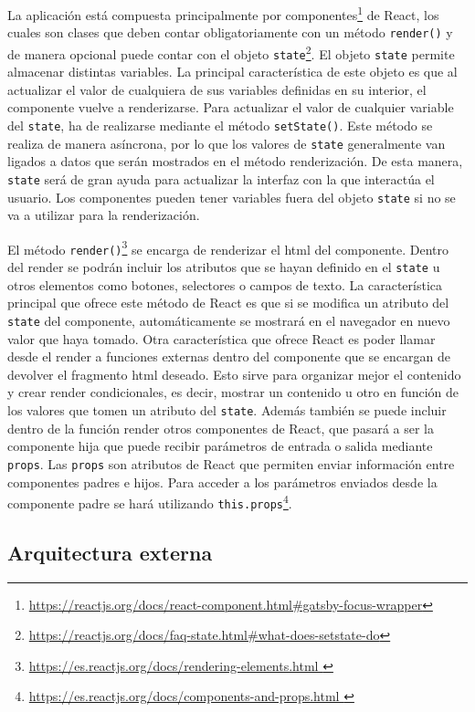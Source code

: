 La aplicación está compuesta principalmente por componentes\footnote{\url{https://reactjs.org/docs/react-component.html\#gatsby-focus-wrapper}} de React, los cuales son clases que deben contar obligatoriamente con un método \texttt{render()} y de manera opcional puede contar con el objeto \texttt{state}\footnote{\url{https://reactjs.org/docs/faq-state.html\#what-does-setstate-do}}. El objeto \texttt{state} permite almacenar distintas variables. La principal característica de este objeto es que al actualizar el valor de cualquiera de sus variables definidas en su interior, el componente vuelve a renderizarse. Para actualizar el valor de cualquier variable del \texttt{state}, ha de realizarse mediante el método \texttt{setState()}. Este método se realiza de manera asíncrona, por lo que los valores de \texttt{state} generalmente van ligados a datos que serán mostrados en el método renderización. De esta manera,  \texttt{state} será de gran ayuda para actualizar la interfaz con la que interactúa el usuario. 
Los componentes pueden tener variables fuera del objeto \texttt{state} si no se va a utilizar para la renderización.  


El método \texttt{render()}\footnote{\url{https://es.reactjs.org/docs/rendering-elements.html }} se encarga de renderizar el html del componente. Dentro del render se podrán incluir los atributos que se hayan definido en el \texttt{state} u otros elementos como botones, selectores o campos de texto. 
La característica principal que ofrece este método de React es que si se modifica un atributo del \texttt{state} del componente, automáticamente se mostrará en el navegador en nuevo valor que haya tomado. Otra característica que ofrece React es poder llamar desde el render a funciones externas dentro del componente que se encargan de devolver el fragmento html deseado. Esto sirve para organizar mejor el contenido y crear render condicionales, es decir, mostrar un contenido u otro en función de los valores que tomen un atributo del \texttt{state}.
Además también se puede incluir dentro de la función render otros componentes de React, que pasará a ser la componente hija que puede recibir parámetros de entrada o salida mediante \texttt{props}. Las \texttt{props} son atributos de React que permiten enviar información entre componentes padres e hijos. Para acceder a los parámetros enviados desde la componente padre se hará utilizando \texttt{this.props}\footnote{\url{https://es.reactjs.org/docs/components-and-props.html }}.

\subsection{Arquitectura externa}

